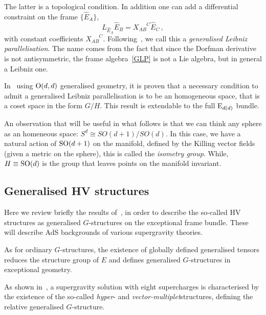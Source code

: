 \documentclass[debug]{phd}
\begin{document}
					The latter is a topological condition.
					In addition one can add a differential constraint on the frame $\{\hat{E}_A\}$, 
							\begin{equation}\label{GLP}
								L_{\hat{E}_A} \hat{E}_B = X_{AB}^{\phantom{AB}C} \hat{E}_C \, ,
							\end{equation}
					with constant coefficients $X_{AB}^{\phantom{AB}C}$.
					Following~\cite{spheres}, we call this a \emph{generalised Leibniz parallelisation}.
					The name comes from the fact that since the Dorfman derivative is not antisymmetric, the frame algebra~\eqref{GLP} is not a Lie algebra, but in general a Leibniz one.
					
					In~\cite{petrini3} using $\mathrm{O}(d,d)$ generalised geometry, it is proven that a necessary condition to admit a generalised Leibniz parallelisation is to be an homogeneous space, that is a coset space in the form $G/H$.
					This result is extendable to the full $\mathrm{E}_{d(d)}$ bundle.
					
					An observation that will be useful in what follows is that we can think any sphere as an homeneous space: $S^d \cong SO(d+1)/SO(d)$. 
					In this case, we have a natural action of $\mathrm{SO}(d+1)$ on the manifold, defined by the Killing vector fields (given a metric on the sphere), this is called the \emph{isometry group}. 
					While, $H \equiv \mathrm{SO}(d)$ is the group that leaves points on the manifold invariant.
					
			\subsection{Generalised HV structures}\label{sec:ESE}
					Here we review briefly the results of~\cite{AshmoreESE}, in order to describe the so-called HV structures as generalised $G$-structures on the exceptional frame bundle.
					These will describe AdS backgrounds of various supergravity theories.
					
					As for ordinary $G$-structures, the existence of globally defined generalised tensors reduces the structure group of $E$ and defines generalised $G$-structures in exceptional geometry.
					
					As shown in~\cite{AshmoreESE, AshmoreECY, Grana_Ntokos}, a supergravity solution with eight supercharges is characterised by the existence of the so-called \emph{hyper}- and \emph{vector-multiplet}structures, defining the relative generalised $G$-structure.
					
\end{document}
